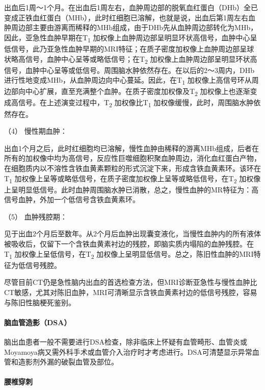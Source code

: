 出血后1周～1个月。在出血后1周左右，血肿周边部的脱氧血红蛋白（DHb）全已变成正铁血红蛋白（MHb），此时红细胞已溶解，也就是说，出血后第1周左右血肿周边部主要由游离而稀释的MHb组成，由于DHb先从血肿周边部转化为MHb，因此，亚急性血肿早期在T\textsubscript{1}
加权像上血肿周边部呈明显环状高信号，血肿中心呈低信号，此乃亚急性血肿早期的MRI特征；在质子密度加权像上血肿周边部呈球状略高信号，血肿中心呈等或略低信号；在T\textsubscript{2}
加权像上血肿周边部呈明显环状高信号，血肿中心呈等或低信号。周围脑水肿依然存在。在以后的2～3周内，DHb进行性地变成MHb，从血肿周边向中心蔓延。因此，在T\textsubscript{1}
加权像上高信号环从周边部向中心扩展，直至充满整个血肿。在质子密度加权像及T\textsubscript{2}
加权像上也逐渐变成高信号。在上述演变过程中，T\textsubscript{2}
加权像比T\textsubscript{1} 加权像缓慢，此时，周围脑水肿依然存在。

\hypertarget{text00243.htmlux5cux23CHP8-1-3-2-2-2-4}{}
（4） 慢性期血肿：

出血1个月之后，此时红细胞均已溶解，慢性血肿由稀释的游离MHb组成，后者在所有的加权像中均为高信号，反应性巨噬细胞积聚血肿周边，消化血红蛋白产物，在细胞质内以不溶性含铁血黄素颗粒的形式沉淀下来，形成含铁血黄素环。该环在T\textsubscript{1}
加权像上呈等或略低信号，在质子密度加权像上呈等或略低信号，在T\textsubscript{2}
加权像上呈明显低信号。此时血肿周围脑水肿已消散，总之，慢性血肿的MR特征为：高信号血肿，外加一个低信号含铁血黄素环。

\hypertarget{text00243.htmlux5cux23CHP8-1-3-2-2-2-5}{}
（5） 血肿残腔期：

见于出血2个月后至数年。从2个月后血肿出现囊变液化，当慢性血肿内的所有液体被吸收后，仅留下一个含铁血黄素衬边的残腔，即脑实质内塌陷的血肿残腔。在T\textsubscript{1}
加权像上呈低信号，在T\textsubscript{2}
加权像上呈明显低信号。总之，陈旧性血肿的MRI特征为低信号残腔。

尽管目前CT仍是急性脑内出血的首选检查方法，但MRI诊断亚急性与慢性血肿比CT敏感，尤其对陈旧血肿，MRI可清晰显示含铁血黄素衬边的低信号残腔，容易与陈旧性脑梗死鉴别。

\paragraph{脑血管造影（DSA）}

脑出血患者一般不需要进行DSA检查，除非临床上怀疑有血管畸形、血管炎或Moyamoya病又需外科手术或血管介入治疗时才考虑进行。DSA可清楚显示异常血管和造影剂外漏的破裂血管及部位。

\paragraph{腰椎穿刺}

